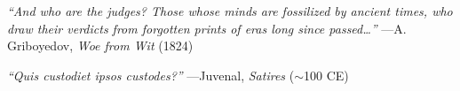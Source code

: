 \documentclass[11pt]{article}
\begin{document}
\vspace{1em}


\begin{center}
\begin{minipage}{0.88\textwidth}
\small
\textit{``And who are the judges? Those whose minds are fossilized by ancient times, who draw their verdicts from forgotten prints of eras long since passed\ldots''}
\hfill ---A.\,Griboyedov, \textit{Woe from Wit} (1824)
\end{minipage}

\vspace{0.3em}
\begin{minipage}{0.88\textwidth}
\small
\textit{``Quis custodiet ipsos custodes?''}
\hfill ---Juvenal, \textit{Satires} ($\sim$100 CE)
\end{minipage}
\end{center}
\vspace{0.5em}

\end{document}
